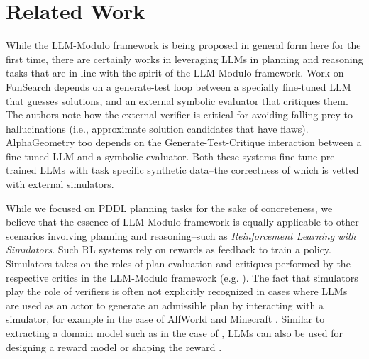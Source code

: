 \documentclass{article}
\theoremstyle{plain}
\theoremstyle{definition}
\theoremstyle{remark}
\begin{document}

\section{Related Work}


While the LLM-Modulo framework is being proposed in general form here for the first time, there are certainly works in leveraging LLMs in planning and reasoning tasks that are in line with the spirit of the LLM-Modulo framework. 
Work on FunSearch \cite{funsearch} depends on a generate-test loop between a specially fine-tuned LLM that guesses solutions, and an external symbolic evaluator that critiques them. The authors note how the external verifier is critical for avoiding falling prey to hallucinations (i.e., approximate solution candidates that have flaws). AlphaGeometry \cite{alphageometry} too depends on the Generate-Test-Critique interaction between a fine-tuned LLM and a symbolic evaluator. Both these systems fine-tune pre-trained LLMs with task specific synthetic data--the correctness of which is vetted with external simulators.


While we focused on PDDL planning tasks for the sake of concreteness, we believe that the essence of LLM-Modulo framework is equally applicable to other scenarios involving planning and reasoning--such as \textit{Reinforcement Learning with Simulators}.  Such RL systems rely on rewards as feedback to train a policy. 
Simulators takes on the roles of 
plan evaluation and critiques performed by the respective critics in the LLM-Modulo framework (e.g. \cite{alvaro-saynav}).
The fact that simulators play the role of verifiers is often
not explicitly recognized in cases where LLMs are used as an actor to generate an admissible plan by interacting with a simulator, for example in the case of AlfWorld \cite{yao2023react, shinn2023reflexion} and Minecraft \cite{wang2023voyager}.
%
Similar to extracting a domain model such as in the case of \cite{guan2023leveraging}, LLMs can also be used for designing a reward model or shaping the reward
\cite{siddhant-llm-rl,kwon2022reward, hao2023reasoning,ma2023eureka}.
\end{document}
